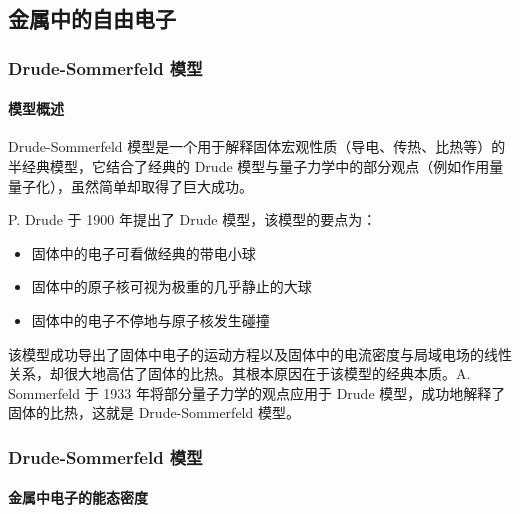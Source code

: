 \documentclass[a4paper]{article}
\begin{document}
\subsection{金属中的自由电子}

\begin{frame}
	\frametitle{Drude-Sommerfeld 模型}
	\framesubtitle{模型概述}
	Drude-Sommerfeld 模型是一个用于解释固体宏观性质（导电、传热、比热等）的半经典模型，它结合了经典的 Drude 模型与量子力学中的部分观点（例如作用量量子化），虽然简单却取得了巨大成功。
	\begin{background}
	P. Drude 于 1900 年提出了 Drude 模型，该模型的要点为：
	\begin{itemize}
	\item 固体中的电子可看做经典的带电小球
	\item 固体中的原子核可视为极重的几乎静止的大球
	\item 固体中的电子不停地与原子核发生碰撞
	\end{itemize}
	该模型成功导出了固体中电子的运动方程以及固体中的电流密度与局域电场的线性关系，却很大地高估了固体的比热。其根本原因在于该模型的经典本质。A. Sommerfeld 于 1933 年将部分量子力学的观点应用于 Drude 模型，成功地解释了固体的比热，这就是 Drude-Sommerfeld 模型。
	\end{background}
\end{frame}

\begin{frame}
	\frametitle{Drude-Sommerfeld 模型}
	\framesubtitle{金属中电子的能态密度}
\end{frame}
\end{document}
